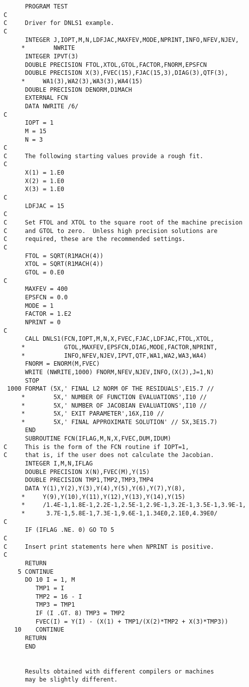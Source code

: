 \begin{verbatim}
       PROGRAM TEST
 C
 C     Driver for DNLS1 example.
 C
       INTEGER J,IOPT,M,N,LDFJAC,MAXFEV,MODE,NPRINT,INFO,NFEV,NJEV,
      *        NWRITE
       INTEGER IPVT(3)
       DOUBLE PRECISION FTOL,XTOL,GTOL,FACTOR,FNORM,EPSFCN
       DOUBLE PRECISION X(3),FVEC(15),FJAC(15,3),DIAG(3),QTF(3),
      *     WA1(3),WA2(3),WA3(3),WA4(15)
       DOUBLE PRECISION DENORM,D1MACH
       EXTERNAL FCN
       DATA NWRITE /6/
 C
       IOPT = 1
       M = 15
       N = 3
 C
 C     The following starting values provide a rough fit.
 C
       X(1) = 1.E0
       X(2) = 1.E0
       X(3) = 1.E0
 C
       LDFJAC = 15
 C
 C     Set FTOL and XTOL to the square root of the machine precision
 C     and GTOL to zero.  Unless high precision solutions are
 C     required, these are the recommended settings.
 C
       FTOL = SQRT(R1MACH(4))
       XTOL = SQRT(R1MACH(4))
       GTOL = 0.E0
 C
       MAXFEV = 400
       EPSFCN = 0.0
       MODE = 1
       FACTOR = 1.E2
       NPRINT = 0
 C
       CALL DNLS1(FCN,IOPT,M,N,X,FVEC,FJAC,LDFJAC,FTOL,XTOL,
      *           GTOL,MAXFEV,EPSFCN,DIAG,MODE,FACTOR,NPRINT,
      *           INFO,NFEV,NJEV,IPVT,QTF,WA1,WA2,WA3,WA4)
       FNORM = ENORM(M,FVEC)
       WRITE (NWRITE,1000) FNORM,NFEV,NJEV,INFO,(X(J),J=1,N)
       STOP
  1000 FORMAT (5X,' FINAL L2 NORM OF THE RESIDUALS',E15.7 //
      *        5X,' NUMBER OF FUNCTION EVALUATIONS',I10 //
      *        5X,' NUMBER OF JACOBIAN EVALUATIONS',I10 //
      *        5X,' EXIT PARAMETER',16X,I10 //
      *        5X,' FINAL APPROXIMATE SOLUTION' // 5X,3E15.7)
       END
       SUBROUTINE FCN(IFLAG,M,N,X,FVEC,DUM,IDUM)
 C     This is the form of the FCN routine if IOPT=1,
 C     that is, if the user does not calculate the Jacobian.
       INTEGER I,M,N,IFLAG
       DOUBLE PRECISION X(N),FVEC(M),Y(15)
       DOUBLE PRECISION TMP1,TMP2,TMP3,TMP4
       DATA Y(1),Y(2),Y(3),Y(4),Y(5),Y(6),Y(7),Y(8),
      *     Y(9),Y(10),Y(11),Y(12),Y(13),Y(14),Y(15)
      *     /1.4E-1,1.8E-1,2.2E-1,2.5E-1,2.9E-1,3.2E-1,3.5E-1,3.9E-1,
      *      3.7E-1,5.8E-1,7.3E-1,9.6E-1,1.34E0,2.1E0,4.39E0/
 C
       IF (IFLAG .NE. 0) GO TO 5
 C
 C     Insert print statements here when NPRINT is positive.
 C
       RETURN
     5 CONTINUE
       DO 10 I = 1, M
          TMP1 = I
          TMP2 = 16 - I
          TMP3 = TMP1
          IF (I .GT. 8) TMP3 = TMP2
          FVEC(I) = Y(I) - (X(1) + TMP1/(X(2)*TMP2 + X(3)*TMP3))
    10    CONTINUE
       RETURN
       END


       Results obtained with different compilers or machines
       may be slightly different.


\end{verbatim}
